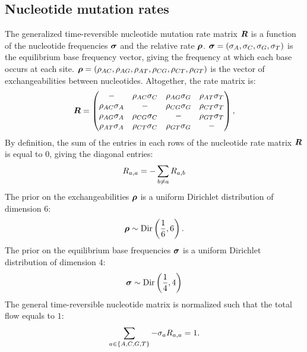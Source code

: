 \subsection{Nucleotide mutation rates}
The generalized time-reversible nucleotide mutation rate matrix $\bm{R}$ is a function of the nucleotide frequencies $\bm{\sigma}$ and the relative rate $\bm{\rho}$.
$\bm{\sigma} = (\sigma_A , \sigma_C , \sigma_G , \sigma_T)$ is the equilibrium base frequency vector, giving the frequency at which each base occurs at each site.
$\bm{\rho} = \left( \rho_{AC}, \rho_{AG}, \rho_{AT}, \rho_{CG}, \rho_{CT}, \rho_{GT}\right)$ is the vector of exchangeabilities between nucleotides.
Altogether, the rate matrix is:
\begin{equation}
\label{eq:gtr-mutrates}
\Mutmatrix = \begin{pmatrix}
- & {\exchan_{AC} \mutequi_C} & {\exchan_{AG}\mutequi_G} & {\exchan_{AT}\mutequi_T} \\ 
{\exchan_{AC}\mutequi_A} & - & {\exchan_{CG}\mutequi_G} & {\exchan_{CT}\mutequi_T} \\ 
{\exchan_{AG}\mutequi_A} & {\exchan_{CG}\mutequi_C} & - & {\exchan_{GT}\mutequi_T} \\ 
{\exchan_{AT}\mutequi_A} & {\exchan_{CT}\mutequi_C} & {\exchan_{GT}\mutequi_G} & - 
\end{pmatrix},
\end{equation}
By definition, the sum of the entries in each rows of the nucleotide rate matrix $\bm{R}$ is equal to $0$, giving the diagonal entries:
\begin{equation}
R_{a,a} = - \sum_{ b \neq a} R_{a,b}
\end{equation}
The prior on the exchangeabilities $\bm{\rho}$ is a uniform Dirichlet distribution of dimension $6$:
\begin{equation}
\label{eq:DistribExchan}
\Exchan \sim \mathrm{Dir}\left( \dfrac{1}{6} , 6\right).
\end{equation}
The prior on the equilibrium base frequencies $\bm{\sigma}$ is a uniform Dirichlet distribution of dimension $4$:
\begin{equation}
\label{eq:DistribMutequi}
\Mutequi \sim \mathrm{Dir}\left( \dfrac{1}{4} , 4\right)
\end{equation}
The general time-reversible nucleotide matrix is normalized such that the total flow equals to $1$:
\begin{equation}
\sum_{a \in \{A, C, G, T\}} - \sigma_a R_{a,a} = 1.
\end{equation}


